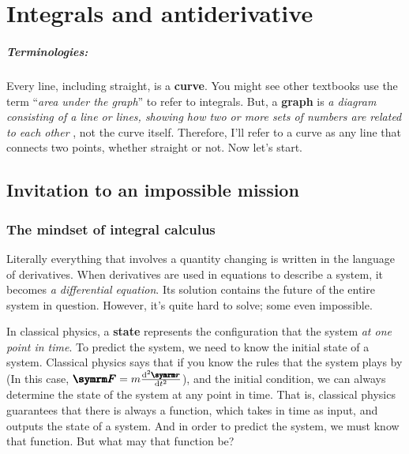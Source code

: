 \chapter{Integrals and antiderivative}
\label{sec:integrals}


\paragraph{Terminologies:} Every line, including straight, is a \textbf{curve}. You might see other textbooks use the term ``\emph{area under the graph}'' to refer to integrals. But, a \textbf{graph} is \textit{a diagram consisting of a line or lines, showing how two or more sets of numbers are related to each other} \cite{oxforddict}, not the curve itself. Therefore, I'll refer to a curve as any line that connects two points, whether straight or not. Now let's start.

\section{Invitation to an impossible mission}

\subsection{The mindset of integral calculus}

Literally everything that involves a quantity changing is written in the language of derivatives. When derivatives are used in equations to describe a system, it becomes \emph{a differential equation}. Its solution contains the future of the entire system in question. However, it's quite hard to solve; some even impossible.

In classical physics, a \textbf{state} represents the configuration that the system \emph{at one point in time}. To predict the system, we need to know the initial state of a system. Classical physics says that if you know the rules that the system plays by (In this case, $\vv{F} = m\odv[ord = 2]{\vv{r}}{t}$), and the initial condition, we can always determine the state of the system at any point in time. That is, classical physics guarantees that there is always a function, which takes in time as input, and outputs the state of a system. And in order to predict the system, we must know that function. But what may that function be?

